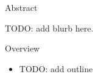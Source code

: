 \documentclass[mathserif, aspectratio=169]{beamer}
\subtitle{\bfseries%
  {TODO: add lecture subtitle}\\%
  {\tiny\it TODO: add topics}\\%
}
\begin{document}


\begin{frame}{Abstract}

	\begin{blurb}
		TODO: add blurb here.
	\end{blurb}
\end{frame}

\begin{frame}{Overview}
	\begin{itemize}
		\item TODO: add outline
	\end{itemize}
\end{frame}
\end{document}
